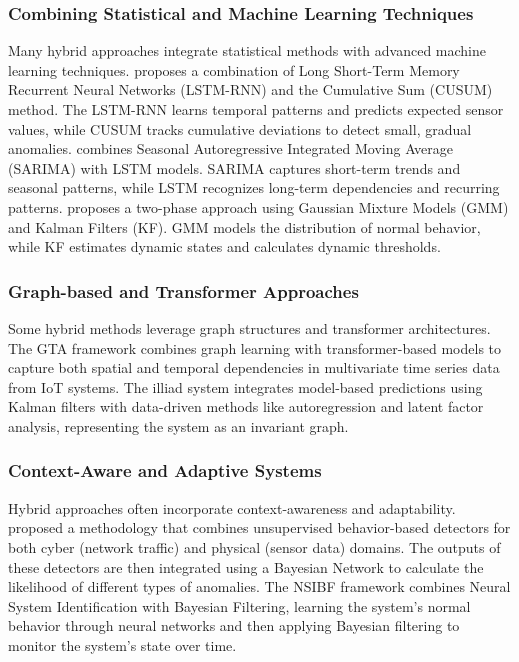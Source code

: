 \subsubsection{Combining Statistical and Machine Learning Techniques}

Many hybrid approaches integrate statistical methods with advanced machine learning techniques. \cite{18} proposes a combination of Long Short-Term Memory Recurrent Neural Networks (LSTM-RNN) and the Cumulative Sum (CUSUM) method. The LSTM-RNN learns temporal patterns and predicts expected sensor values, while CUSUM tracks cumulative deviations to detect small, gradual anomalies. \cite{60} combines Seasonal Autoregressive Integrated Moving Average (SARIMA) with LSTM models. SARIMA captures short-term trends and seasonal patterns, while LSTM recognizes long-term dependencies and recurring patterns. \cite{17} proposes a two-phase approach using Gaussian Mixture Models (GMM) and Kalman Filters (KF). GMM models the distribution of normal behavior, while KF estimates dynamic states and calculates dynamic thresholds.

\subsubsection{Graph-based and Transformer Approaches}

Some hybrid methods leverage graph structures and transformer architectures. The GTA framework \cite{75} combines graph learning with transformer-based models to capture both spatial and temporal dependencies in multivariate time series data from IoT systems. The illiad system \cite{23} integrates model-based predictions using Kalman filters with data-driven methods like autoregression and latent factor analysis, representing the system as an invariant graph.

\subsubsection{Context-Aware and Adaptive Systems}

Hybrid approaches often incorporate context-awareness and adaptability.\cite{48} proposed a methodology that combines unsupervised behavior-based detectors for both cyber (network traffic) and physical (sensor data) domains. The outputs of these detectors are then integrated using a Bayesian Network to calculate the likelihood of different types of anomalies. The NSIBF framework \cite{45} combines Neural System Identification with Bayesian Filtering, learning the system's normal behavior through neural networks and then applying Bayesian filtering to monitor the system's state over time.

